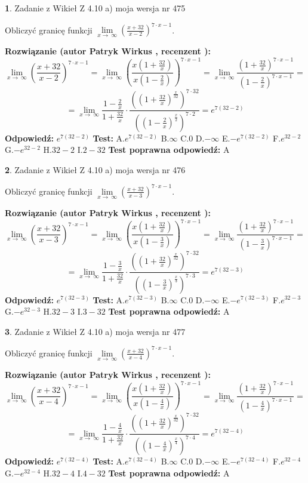 \documentclass[12pt, a4paper]{article}
\theoremstyle{definition} %
\newtheorem{zad}{}
\newcommand{\zadStart}[1]{\begin{zad}#1\newline}
\newcommand{\zadStop}{\end{zad}}
\newcommand{\rozwStart}[2]{\noindent \textbf{Rozwiązanie (autor #1 , recenzent #2): }\newline}
\newcommand{\rozwStop}{\newline}
\newcommand{\odpStart}{\noindent \textbf{Odpowiedź:}\newline}
\newcommand{\odpStop}{\newline}
\newcommand{\testStart}{\noindent \textbf{Test:}\newline}
\newcommand{\testStop}{\newline}
\newcommand{\kluczStart}{\noindent \textbf{Test poprawna odpowiedź:}\newline}
\newcommand{\kluczStop}{\newline}
\begin{document}
\zadStart{Zadanie z Wikieł Z 4.10 a) moja wersja nr 475}


Obliczyć granicę funkcji  $\lim\limits_{x\to\ \infty}(\frac{x+32}{x-2})^{7\cdot x-1}$.
\zadStop
\rozwStart{Patryk Wirkus}{}
$$\lim\limits_{x\to\ \infty}(\frac{x+32}{x-2})^{7\cdot x-1} = \lim\limits_{x\to\ \infty}(\frac{x(1+\frac{32}{x})}{x(1-\frac{2}{x})})^{7\cdot x-1}=\lim\limits_{x\to\ \infty}\frac{(1+\frac{32}{x})^{7\cdot x-1}}{(1-\frac{2}{x})^{7\cdot x-1}}=$$
$$=\lim\limits_{x\to\ \infty}\frac{1-\frac{2}{x}}{1+\frac{32}{x}}\cdot\frac{((1+\frac{32}{x})^{\frac{x}{32}})^{7\cdot32}}{((1-\frac{2}{x})^{\frac{x}{2}})^{7\cdot2}}=e^{7(32-2)}$$
\rozwStop
\odpStart
$e^{7(32-2)}$
\odpStop
\testStart
A.$e^{7(32-2)}$ B.$\infty$ C.$0$ D.$-\infty$ E.$-e^{7(32-2)}$
F.$e^{32-2}$ G.$-e^{32-2}$
H.$32-2$
I.$2-32$
\testStop
\kluczStart
A
\kluczStop



\zadStart{Zadanie z Wikieł Z 4.10 a) moja wersja nr 476}


Obliczyć granicę funkcji  $\lim\limits_{x\to\ \infty}(\frac{x+32}{x-3})^{7\cdot x-1}$.
\zadStop
\rozwStart{Patryk Wirkus}{}
$$\lim\limits_{x\to\ \infty}(\frac{x+32}{x-3})^{7\cdot x-1} = \lim\limits_{x\to\ \infty}(\frac{x(1+\frac{32}{x})}{x(1-\frac{3}{x})})^{7\cdot x-1}=\lim\limits_{x\to\ \infty}\frac{(1+\frac{32}{x})^{7\cdot x-1}}{(1-\frac{3}{x})^{7\cdot x-1}}=$$
$$=\lim\limits_{x\to\ \infty}\frac{1-\frac{3}{x}}{1+\frac{32}{x}}\cdot\frac{((1+\frac{32}{x})^{\frac{x}{32}})^{7\cdot32}}{((1-\frac{3}{x})^{\frac{x}{3}})^{7\cdot3}}=e^{7(32-3)}$$
\rozwStop
\odpStart
$e^{7(32-3)}$
\odpStop
\testStart
A.$e^{7(32-3)}$ B.$\infty$ C.$0$ D.$-\infty$ E.$-e^{7(32-3)}$
F.$e^{32-3}$ G.$-e^{32-3}$
H.$32-3$
I.$3-32$
\testStop
\kluczStart
A
\kluczStop



\zadStart{Zadanie z Wikieł Z 4.10 a) moja wersja nr 477}


Obliczyć granicę funkcji  $\lim\limits_{x\to\ \infty}(\frac{x+32}{x-4})^{7\cdot x-1}$.
\zadStop
\rozwStart{Patryk Wirkus}{}
$$\lim\limits_{x\to\ \infty}(\frac{x+32}{x-4})^{7\cdot x-1} = \lim\limits_{x\to\ \infty}(\frac{x(1+\frac{32}{x})}{x(1-\frac{4}{x})})^{7\cdot x-1}=\lim\limits_{x\to\ \infty}\frac{(1+\frac{32}{x})^{7\cdot x-1}}{(1-\frac{4}{x})^{7\cdot x-1}}=$$
$$=\lim\limits_{x\to\ \infty}\frac{1-\frac{4}{x}}{1+\frac{32}{x}}\cdot\frac{((1+\frac{32}{x})^{\frac{x}{32}})^{7\cdot32}}{((1-\frac{4}{x})^{\frac{x}{4}})^{7\cdot4}}=e^{7(32-4)}$$
\rozwStop
\odpStart
$e^{7(32-4)}$
\odpStop
\testStart
A.$e^{7(32-4)}$ B.$\infty$ C.$0$ D.$-\infty$ E.$-e^{7(32-4)}$
F.$e^{32-4}$ G.$-e^{32-4}$
H.$32-4$
I.$4-32$
\testStop
\kluczStart
A
\kluczStop
\end{document}
